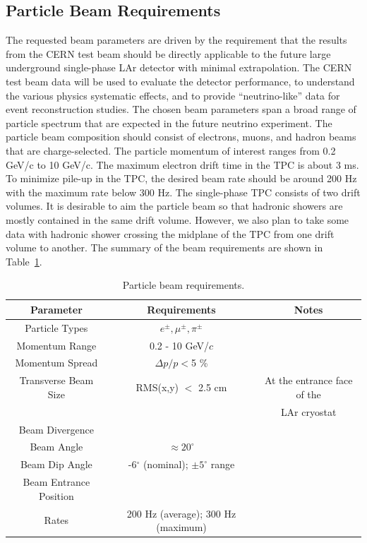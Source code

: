 
\subsection{Particle Beam Requirements}
The requested beam parameters are driven by the requirement that the results from the CERN test beam should be directly applicable to the future large underground single-phase LAr detector with minimal extrapolation. The CERN test beam data will be used to evaluate the detector performance, to understand the various physics systematic effects, and to provide ``neutrino-like'' data for event reconstruction studies. The chosen beam parameters span a broad range of particle spectrum that are expected in the future neutrino experiment. The particle beam composition should consist of electrons, muons, and hadron beams that are charge-selected. The particle momentum of interest ranges from 0.2 GeV/c to 10 GeV/c. The maximum electron drift time in the TPC is about 3 ms. To minimize pile-up in the TPC, the desired beam rate should be around 200 Hz with the maximum rate below 300 Hz. The single-phase TPC consists of two drift volumes. It is desirable to aim the particle beam so that hadronic showers are mostly contained in the same drift volume.  However, we also plan to take some data with hadronic shower crossing the midplane of the TPC from one drift volume to another.  The summary of the beam requirements are shown in Table~\ref{table:beamspecs}.

\begin{table}[h]
\centering
\caption{Particle beam requirements.}
\label{table:beamspecs}
\begin{tabular}{|c|c|c|}
\hline
\textbf{Parameter } & \textbf{Requirements} & \textbf{Notes}  \\ \hline
  Particle Types        & $e^\pm,\mu^\pm,\pi^\pm$          &                   \\ \hline
  Momentum Range   & 0.2 - 10 GeV/$c$  &   \\ \hline
  Momentum Spread   & $\Delta p/p  < $5 \%  &   \\ \hline
  Transverse Beam Size   & RMS(x,y) $<$ 2.5 cm &  At the entrance face of the \\ 
                                              &                                        & LAr cryostat \\ \hline
  Beam Divergence &   &   \\ \hline
  Beam Angle &  $\approx20^{\circ}$  &   \\ \hline
  Beam Dip Angle &  -6$^\circ$ (nominal); $\pm5^\circ$ range &   \\ \hline
  Beam Entrance Position &   &   \\ \hline
  Rates & 200 Hz (average); 300 Hz (maximum)  &   \\ \hline
\end{tabular}
\end{table}

